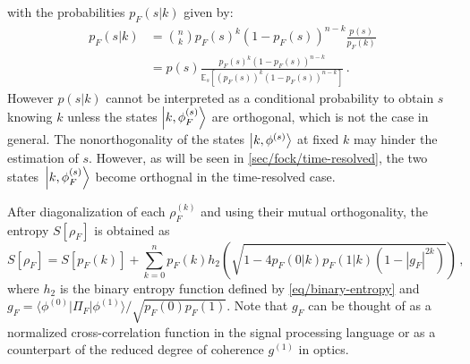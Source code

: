 with the probabilities $p_F(s|k)$ given by:
\begin{align}
p_F(s|k) &=
\binom{n}{k}p_F(s)^k (1-p_F(s))^{n-k} 
\frac{p(s)}{p_F(k)} \nonumber \\
&=p(s)
	\frac{p_F(s)^k (1-p_F(s))^{n-k} }{\mathbb{E}_{s}
	\left[
	(p_F(s))^k
	(1-p_F(s))^{n-k}
	\right]}
\,.
\end{align}
However
$p(s|k)$ cannot be interpreted as a conditional probability
to obtain $s$ knowing $k$ unless the states $\ket{k,\phi^{(s)}_F}$
are orthogonal, which is not the case in general. The nonorthogonality
of the states $\ket{k,\phi^{(s)}}$ at fixed $k$ may hinder the
estimation of $s$. However, as will be seen in \cref{sec/fock/time-resolved}, the
two states~$\ket{k,\phi^{(s)}_F}$ become orthognal
in the time-resolved case.

After diagonalization of each $\rho_F^{(k)}$ and using their mutual
orthogonality,
the entropy $S[\rho_F]$ is obtained as
%
\begin{equation}
S[\rho_F] = S[p_F(k)] + 
	\sum_{k=0}^n p_F(k)
	h_2\left(\sqrt{1-4p_F(0|k)p_F(1|k)(1-|g_F|^{2k})}\right)
\,,
\end{equation}
where $h_2$ is the binary entropy function defined by
\cref{eq/binary-entropy}
and $g_F =  \langle \phi^{(0)}|\Pi_F|\phi^{(1)} \rangle/
\sqrt{p_F(0)p_F(1)}$. Note that $g_F$ can be thought of 
as a normalized cross-correlation function in the signal
processing language or as a counterpart of the reduced 
degree of coherence $g^{(1)}$ in optics.


